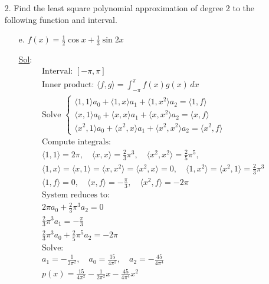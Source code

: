 \begin{enumerate}
  \item[2.] Find the least square polynomial approximation of degree
    2 to the following function and interval.
    \begin{enumerate}
      \item[e.] \(f(x) = \frac{1}{2} \cos x + \frac{1}{3} \sin 2x\)

        \underline{Sol}:\\

        \[
          \begin{array}{l}
            \text{Interval: } [-\pi, \pi] \\
            \text{Inner product: } \langle f,g \rangle =
            \int_{-\pi}^{\pi} f(x)g(x)\,dx \\
            \text{Solve }
            \begin{cases}
              \langle 1,1 \rangle a_0 + \langle 1,x \rangle a_1 +
              \langle 1,x^2 \rangle a_2 = \langle 1,f \rangle \\
              \langle x,1 \rangle a_0 + \langle x,x \rangle a_1 +
              \langle x,x^2 \rangle a_2 = \langle x,f \rangle \\
              \langle x^2,1 \rangle a_0 + \langle x^2,x \rangle a_1 +
              \langle x^2,x^2 \rangle a_2 = \langle x^2,f \rangle
            \end{cases} \\
            \text{Compute integrals:} \\
            \langle 1,1 \rangle = 2\pi, \quad \langle x,x \rangle =
            \frac{2}{3}\pi^3, \quad \langle x^2,x^2 \rangle =
            \frac{2}{5}\pi^5, \\
            \langle 1,x \rangle = \langle x,1 \rangle = \langle x,x^2
            \rangle = \langle x^2,x \rangle = 0, \quad \langle 1,x^2
            \rangle = \langle x^2,1 \rangle = \frac{2}{3}\pi^3 \\
            \langle 1,f \rangle = 0, \quad \langle x,f \rangle =
            -\frac{\pi}{3}, \quad \langle x^2,f \rangle = -2\pi \\
            \text{System reduces to:} \\
            2\pi a_0 + \frac{2}{3}\pi^3 a_2 = 0 \\
            \frac{2}{3}\pi^3 a_1 = -\frac{\pi}{3} \\
            \frac{2}{3}\pi^3 a_0 + \frac{2}{5}\pi^5 a_2 = -2\pi \\
            \text{Solve:} \\
            a_1 = -\frac{1}{2\pi^2}, \quad a_0 = \frac{15}{4\pi^2},
            \quad a_2 = -\frac{45}{4\pi^4} \\
            \boxed{p(x) = \frac{15}{4\pi^2} - \frac{1}{2\pi^2}x -
            \frac{45}{4\pi^4}x^2}
          \end{array}
        \]
    \end{enumerate}


\end{enumerate}
